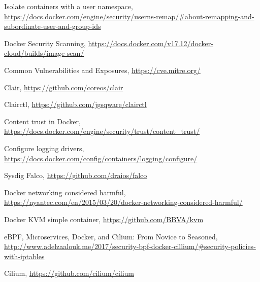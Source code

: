 \documentclass[a4paper,12pt]{article}
\begin{document}
\begin{thebibliography}{99}
Isolate containers with a user namespace,
\url{https://docs.docker.com/engine/security/userns-remap/#about-remapping-and-subordinate-user-and-group-ids}

Docker Security Scanning,
\url{https://docs.docker.com/v17.12/docker-cloud/builds/image-scan/}

Common Vulnerabilities and Exposures, \url{https://cve.mitre.org/}

Clair, \url{https://github.com/coreos/clair} 

Clairctl, \url{https://github.com/jgsqware/clairctl}

Content trust in Docker,
\url{https://docs.docker.com/engine/security/trust/content_trust/}

Configure logging drivers,
\url{https://docs.docker.com/config/containers/logging/configure/}

Sysdig Falco, \url{https://github.com/draios/falco}

Docker networking considered harmful,
\url{https://nyantec.com/en/2015/03/20/docker-networking-considered-harmful/}

Docker KVM simple container, \url{https://github.com/BBVA/kvm}

eBPF, Microservices, Docker, and Cilium: From Novice to Seasoned, \url{http://www.adelzaalouk.me/2017/security-bpf-docker-cillium/#security-policies-with-iptables}

Cilium, \url{https://github.com/cilium/cilium}

\end{thebibliography}
\end{document}
